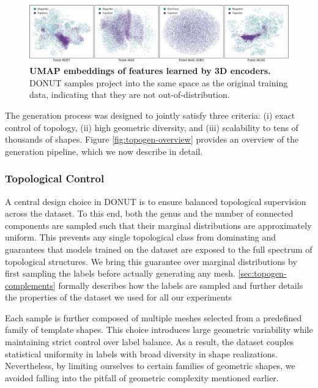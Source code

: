 \begin{figure}
  \centering
  \includegraphics[width=\linewidth]{figs/topogen/umaps_overview.pdf}
  \caption{\textbf{UMAP embeddings of features learned by 3D encoders.} DONUT samples project into the same space as the original training data, indicating that they are not out-of-distribution.}
  \label{fig:topogen-umaps-overview}
\end{figure}

The generation process was designed to jointly satisfy three criteria: (i) exact control of topology, (ii) high geometric diversity, and (iii) scalability to tens of thousands of shapes. Figure \ref{fig:topogen-overview} provides an overview of the generation pipeline, which we now describe in detail.

\subsubsection{Topological Control}
\label{sssec:labels-distribution}

A central design choice in DONUT is to ensure balanced topological supervision across the dataset. To this end, both the genus and the number of connected components are sampled such that their marginal distributions are approximately uniform. This prevents any single topological class from dominating and guarantees that models trained on the dataset are exposed to the full spectrum of topological structures. We bring this guarantee over marginal distributions by first sampling the labels before actually generating any mesh. \ref{sec:topogen-complements} formally describes how the labels are sampled and further details the properties of the dataset we used for all our experiments

Each sample is further composed of multiple meshes selected from a predefined family of template shapes. This choice introduces large geometric variability while maintaining strict control over label balance. As a result, the dataset couples statistical uniformity in labels with broad diversity in shape realizations. Nevertheless, by limiting ourselves to certain families of geometric shapes, we avoided falling into the pitfall of geometric complexity mentioned earlier. 

